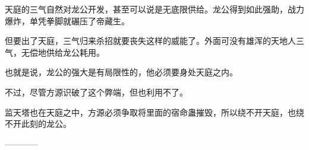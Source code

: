 \begin{this_body}
天庭的三气自然对龙公开发，甚至可以说是无底限供给。龙公得到如此强助，战力爆炸，单凭拳脚就碾压了帝藏生。

但要出了天庭，三气归来杀招就要丧失这样的威能了。外面可没有雄浑的天地人三气，无偿地供给龙公耗用。

也就是说，龙公的强大是有局限性的，他必须要身处天庭之内。

不过，尽管方源识破了这个弊端，但也利用不了。

监天塔也在天庭之中，方源必须争取将里面的宿命蛊摧毁，所以绕不开天庭，也绕不开此刻的龙公。

------------

\end{this_body}

